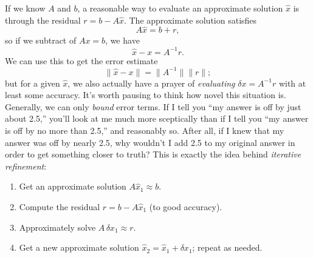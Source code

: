 \documentclass[12pt, leqno]{article}
\begin{document}
If we know $A$ and $b$, a reasonable way to evaluate an approximate
solution $\hat{x}$ is through the residual $r = b-A\hat{x}$.  The
approximate solution satisfies
\[
  A \hat{x} = b + r,
\]
so if we subtract of $Ax = b$, we have
\[
  \hat{x}-x = A^{-1} r.
\]
We can use this to get the error estimate
\[
  \|\hat{x}-x\| = \|A^{-1}\| \|r\|;
\]
but for a given $\hat{x}$, we also actually have a prayer of {\em evaluating}
$\delta x = A^{-1} r$ with at least some accuracy.
%
It's worth pausing to think how novel this situation is.
Generally, we can only {\em bound} error terms.
If I tell you ``my answer is off by just about 2.5,''
you'll look at me much more sceptically than if I tell
you ``my answer is off by no more than 2.5,'' and reasonably so.
After all, if I knew that my answer was off by nearly 2.5, why wouldn't
I add 2.5 to my original answer in order to get something closer to truth?
This is exactly the idea behind {\em iterative refinement}:
\begin{enumerate}
\item
  Get an approximate solution $A \hat{x}_1 \approx b$.
\item
  Compute the residual $r = b-A\hat{x}_1$ (to good accuracy).
\item
  Approximately solve $A \, \delta x_1 \approx r$.
\item
  Get a new approximate solution $\hat{x}_2 = \hat{x}_1+\delta x_1$;
  repeat as needed.
\end{enumerate}
\end{document}
